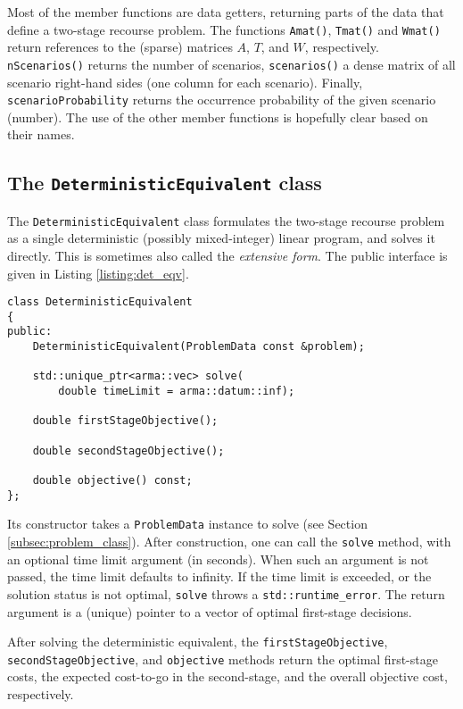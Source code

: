 \documentclass[12pt, english]{article}
\begin{document}
Most of the member functions are data getters, returning parts of the data that define a two-stage recourse problem. The functions \texttt{Amat()}, \texttt{Tmat()} and \texttt{Wmat()} return references to the (sparse) matrices $A$, $T$, and $W$, respectively. \texttt{nScenarios()} returns the number of scenarios, \texttt{scenarios()} a dense matrix of all scenario right-hand sides (one column for each scenario). Finally, \texttt{scenarioProbability} returns the occurrence probability of the given scenario (number). The use of the other member functions is hopefully clear based on their names.

\subsection{The \texttt{DeterministicEquivalent} class}
\label{subsec:det_eqv_class}

The \texttt{DeterministicEquivalent} class formulates the two-stage recourse problem as a single deterministic (possibly mixed-integer) linear program, and solves it directly. This is sometimes also called the \textit{extensive form}. The public interface is given in Listing \ref{listing:det_eqv}.
\begin{lstlisting}[caption={Public interface of the \texttt{DeterministicEquivalent} class.},
                   label={listing:det_eqv}]
class DeterministicEquivalent
{
public:
	DeterministicEquivalent(ProblemData const &problem);
	
	std::unique_ptr<arma::vec> solve(
		double timeLimit = arma::datum::inf);
	
	double firstStageObjective();
	
	double secondStageObjective();
	
	double objective() const;
};
\end{lstlisting}
Its constructor takes a \texttt{ProblemData} instance to solve (see Section \ref{subsec:problem_class}). After construction, one can call the \texttt{solve} method, with an optional time limit argument (in seconds). When such an argument is not passed, the time limit defaults to infinity. If the time limit is exceeded, or the solution status is not optimal, \texttt{solve} throws a \texttt{std::runtime\_error}. The return argument is a (unique) pointer to a
vector of optimal first-stage decisions.

After solving the deterministic equivalent, the \texttt{firstStageObjective}, \texttt{secondStageObjective}, and \texttt{objective} methods return the optimal first-stage costs, the expected cost-to-go in the second-stage, and the overall objective cost, respectively.
\end{document}
